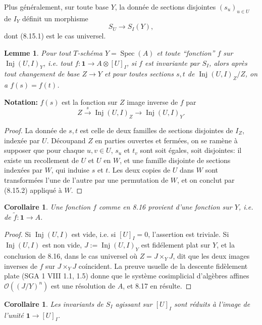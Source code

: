 \documentclass[11pt,a4paper]{article}
\theoremstyle{plain}
\newtheorem{lemma}[theorem]{Lemme}
\newtheorem{corollary}[theorem]{Corollaire}
\theoremstyle{definition}
\DeclareMathOperator{\Spec}{Spec}
\DeclareMathOperator{\Inj}{Inj}
\begin{document}
Plus g\'en\'eralement, sur toute base $Y$, la donn\'ee de sections disjointes $(s_u)_{u \in U}$ de $I_Y$ d\'efinit un morphisme
\begin{equation}
S_U \to S_I(Y), \tag{8.15.2}
\end{equation}
dont (8.15.1) est le cas universel.

\begin{lemma}
Pour tout $T$-sch\'ema $Y = \Spec(A)$ et toute ``fonction'' $f$ sur $\Inj(U, I)_Y$, i.e. tout $f : \mathbf{1} \to A \otimes [U]_I$, si $f$ est invariante par $S_I$, alors apr\`es tout changement de base $Z \to Y$ et pour toutes sections $s, t$ de $\Inj(U, I)_Z/Z$, on a $f(s) = f(t)$.
\end{lemma}

\noindent\textbf{Notation:} $f(s)$ est la fonction sur $Z$ image inverse de $f$ par
\[
Z \xrightarrow{s} \Inj(U, I)_Z \to \Inj(U, I)_Y.
\]

\begin{proof}
La donn\'ee de $s, t$ est celle de deux familles de sections disjointes de $I_Z$, index\'ee par $U$. D\'ecoupand $Z$ en parties ouvertes et ferm\'ees, on se ram\`ene \`a supposer que pour chaque $u, v \in U$, $s_u$ et $t_v$ sont soit \'egales, soit disjointes: il existe un recollement de $U$ et $U$ en $W$, et une famille disjointe de sections index\'ees par $W$, qui induise $s$ et $t$. Les deux copies de $U$ dans $W$ sont transform\'ees l'une de l'autre par une permutation de $W$, et on conclut par (8.15.2) appliqu\'e \`a $W$.
\end{proof}

\begin{corollary}
Une fonction $f$ comme en 8.16 provient d'une fonction sur $Y$, i.e. de $\tilde{f} : \mathbf{1} \to A$.
\end{corollary}

\begin{proof}
Si $\Inj(U, I)$ est vide, i.e. si $[U]_I = 0$, l'assertion est triviale. Si $\Inj(U, I)$ est non vide, $J := \Inj(U, I)_Y$ est fid\'element plat sur $Y$, et la conclusion de 8.16, dans le cas universel o\`u $Z = J \times_Y J$, dit que les deux images inverses de $f$ sur $J \times_Y J$ co\'incident. La preuve usuelle de la descente fid\`element plate (SGA 1 VIII 1.1, 1.5) donne que le syst\`eme cosimplicial d'alg\`ebres affines $\mathcal{O}((J/Y)^n)$ est une r\'esolution de $A$, et 8.17 en r\'esulte.
\end{proof}

\begin{corollary}
Les invariants de $S_I$ agissant sur $[U]_I$ sont r\'eduits \`a l'image de l'unit\'e $\mathbf{1} \to [U]_I$.
\end{corollary}
\end{document}
